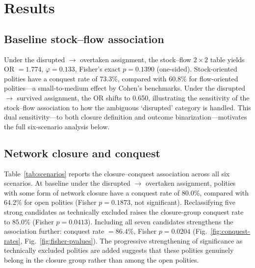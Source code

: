 \documentclass[pdflatex,sn-basic]{sn-jnl}
\theoremstyle{thmstyleone}%
\theoremstyle{thmstyletwo}%
\theoremstyle{thmstylethree}%
\begin{document}
\section{Results}\label{sec:results}

\subsection{Baseline stock--flow association}\label{sec:results-baseline}

Under the disrupted $\to$ overtaken assignment, the stock--flow $2 \times 2$ table yields OR $= 1.774$, $\varphi = 0.133$, Fisher's exact $p = 0.1390$ (one-sided). Stock-oriented polities have a conquest rate of 73.3\%, compared with 60.8\% for flow-oriented polities---a small-to-medium effect by Cohen's benchmarks. Under the disrupted $\to$ survived assignment, the OR shifts to 0.650, illustrating the sensitivity of the stock--flow association to how the ambiguous `disrupted' category is handled. This dual sensitivity---to both closure definition and outcome binarization---motivates the full six-scenario analysis below.

\subsection{Network closure and conquest}\label{sec:results-closure}

Table~\ref{tab:scenarios} reports the closure--conquest association across all six scenarios. At baseline under the disrupted $\to$ overtaken assignment, polities with some form of network closure have a conquest rate of 80.0\%, compared with 64.2\% for open polities (Fisher $p = 0.1873$, not significant). Reclassifying five strong candidates as technically excluded raises the closure-group conquest rate to 85.0\% (Fisher $p = 0.0413$). Including all seven candidates strengthens the association further: conquest rate $= 86.4\%$, Fisher $p = 0.0204$ (Fig.~\ref{fig:conquest-rates}, Fig.~\ref{fig:fisher-pvalues}). The progressive strengthening of significance as technically excluded polities are added suggests that these polities genuinely belong in the closure group rather than among the open polities.
\end{document}
